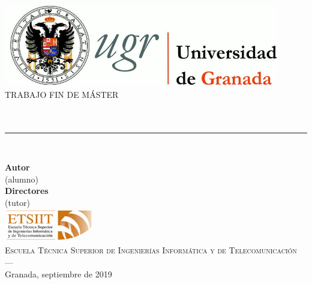 \begin{titlepage}
 
\newlength{\centeroffset}
\setlength{\centeroffset}{-0.5\oddsidemargin}
\addtolength{\centeroffset}{0.5\evensidemargin}
\thispagestyle{empty}

\noindent\hspace*{\centeroffset}\begin{minipage}{\textwidth}

\centering
\includegraphics[width=0.9\textwidth]{imagenes/logo_ugr.jpg}\\[1cm]

\textsc{ \Large TRABAJO FIN DE MÁSTER\\[0.2cm]}
\textsc{ \myDegree}\\[1cm]
% 
{\Huge \bfseries \myTitle \\
}
\noindent\rule[-1ex]{\textwidth}{3pt}\\[3.5ex]
\end{minipage}

\vspace{1cm}
\noindent\hspace*{\centeroffset}\begin{minipage}{\textwidth}
\centering

\textbf{Autor}\\ {\myName (alumno)}\\[2.5ex]
\textbf{Directores}\\ {\myProf (tutor)}\\[3.5ex]
\includegraphics[width=0.3\textwidth]{imagenes/etsiit_logo.png}\\[0.5cm]
\textsc{Escuela Técnica Superior de Ingenierías Informática y de Telecomunicación}\\
\textsc{---}\\
Granada, septiembre de 2019
\end{minipage}
\end{titlepage}


